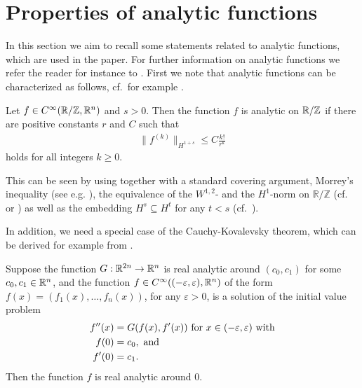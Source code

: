 
\section{Properties of analytic functions}

In this section we aim to recall some statements related to analytic functions, which are used in the paper. For further information on analytic functions we refer the reader for instance to \cite{KrantzParks:2002:Aprimerofrealanalyticfunctions}. 
First we note that analytic functions can be characterized as follows, cf.\ for example \cite[Corollary~3.2]{Vorderobermeier:2019:CriticalOHara}.

\begin{proposition} \label{cor:TayloranalyticSob}
	Let $f\in C^\infty (\mathbb R / \mathbb Z,\mathbb{R}^n)$ and $s>0$. Then the function $f$ is analytic on $\mathbb{R}/\mathbb{Z}$ if  there are positive constants $r$ and $C$ such that
	\begin{align*}
	\|f^{(k)}\|_{H^{1+s}} \leq C \frac{k!}{r^{k}}
	\end{align*}
	holds for all integers $k \geq 0$.
\end{proposition}

This can be seen by using \cite[Proposition~1.2.12]{KrantzParks:2002:Aprimerofrealanalyticfunctions} together with a standard covering argument, Morrey's inequality (see e.g. \cite[Paragraph~4.16]{AdamsFournier:2003:SobolevSpaces}), the equivalence of the $W^{1,2}$- and the $H^1$-norm on $\mathbb R / \mathbb Z$ (cf.~\cite[Lem.~1.2]{Reiter:2012:RepulsiveKnotEnergies} or \cite[7.62]{AdamsFournier:2003:SobolevSpaces}) as well as the embedding $H^s\subseteq H^t$ for any $t < s$ (cf.~\cite[Chapter~4,~Proposition~3.4]{Taylor:1996:PartialDifferentialEquationsa}).


In addition, we need a special case of the Cauchy-Kovalevsky theorem, which can be derived for example from \cite[(1.25)]{Folland:1995}.


\begin{theorem}\label{thm:CK}
	Suppose the function $G: \mathbb{R}^{2n} \rightarrow \mathbb{R}^n$ is real analytic around $(c_0,c_1)$ for some $c_0,c_1 \in\mathbb{R}^n$, and the function $f \in C^\infty((-\varepsilon, \varepsilon),\mathbb{R}^n)$ of the form $f(x)= (f_1(x),\ldots,f_n(x))$, for any $ \varepsilon > 0$, is a solution of the initial value problem 
	\begin{align*}
	f''(x) & = G(f(x), f'(x)) \textnormal{ for } x \in (-\varepsilon,\varepsilon) \textnormal{ with}\\
	f(0)& =c_0, \textnormal{ and}\\
	f'(0) & = c_1. 
	\end{align*}
	Then the function $f$ is real analytic around $0$.
\end{theorem}

